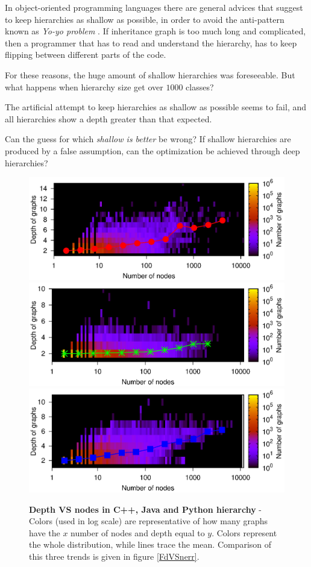 In object-oriented programming languages there are general advices that suggest to keep hierarchies as shallow as possible, in order to avoid the anti-pattern known as \textit{Yo-yo problem} \cite{yoyo}. If inheritance graph is too much long and complicated, then a programmer that has to read and understand the hierarchy, has to keep flipping between different parts of the code.

For these reasons, the huge amount of shallow hierarchies was foreseeable. But what happens when hierarchy size get over $1000$ classes?

The artificial attempt to keep hierarchies as shallow as possible seems to fail, and all hierarchies show a depth greater than that expected.

Can the guess for which \textit{shallow is better} be wrong? If shallow hierarchies are produced by a false assumption, can the optimization be achieved through deep hierarchies?

\begin{figure}[p]%
\includegraphics[width=\textwidth,draft=false]{grafici/Heatmap.cpp.eps}
\includegraphics[width=\textwidth,draft=false]{grafici/Heatmap.java.eps}
\includegraphics[width=\textwidth,draft=false]{grafici/Heatmap.py.eps}
\caption{\label{FdVSnheat} \footnotesize\textbf{Depth VS nodes in C++, Java and Python hierarchy} - Colors (used in log scale) are representative of how many graphs have the $x$ number of nodes and depth equal to $y$. Colors represent the whole distribution, while lines trace the mean. Comparison of this three trends is given in figure \ref{FdVSnerr}. }
\end{figure}

